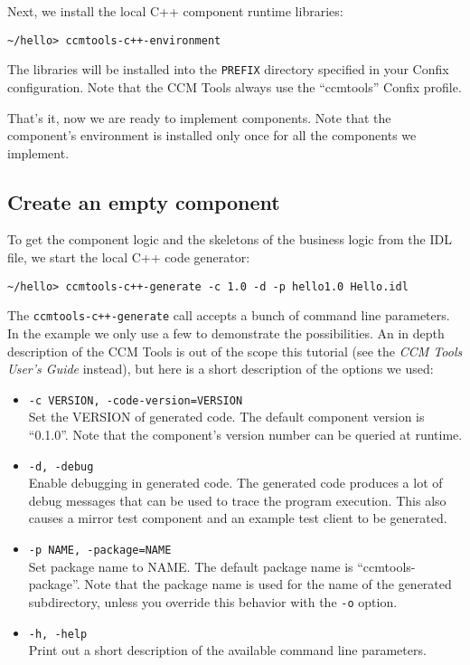 Next, we install the local C++ component runtime libraries:
\begin{small}
\begin{verbatim}
~/hello> ccmtools-c++-environment
\end{verbatim}
\end{small}
The libraries will be installed into the {\tt PREFIX} directory specified in
your Confix configuration. Note that the CCM Tools always use the ``ccmtools''
Confix profile.

That's it, now we are ready to implement components. Note that the component's
environment is installed only once for all the components we implement.

\subsection{Create an empty component}

To get the component logic and the skeletons of the business logic from the IDL
file, we start the local C++ code generator:
\begin{small}
\begin{verbatim}
~/hello> ccmtools-c++-generate -c 1.0 -d -p hello1.0 Hello.idl
\end{verbatim}
\end{small}

The {\tt ccmtools-c++-generate} call accepts a bunch of command line parameters.
In the example we only use a few to demonstrate the possibilities. An in depth
description of the CCM Tools is out of the scope this tutorial (see the {\it CCM
Tools User's Guide} instead), but here is a short description of the options we
used:
\begin{itemize}
\item {\tt -c VERSION, -\-code-version=VERSION }\\
Set the VERSION of generated code. The default component version is ``0.1.0''.
Note that the component's version number can be queried at runtime.

\item {\tt -d, -\-debug }\\
Enable debugging in generated code. The generated code produces a lot of debug
messages that can be used to trace the program execution. This also causes a
mirror test component and an example test client to be generated.

\item {\tt -p NAME, -\-package=NAME}\\
Set package name to NAME. The default package name is ``ccmtools-package''. Note
that the package name is used for the name of the generated subdirectory, unless
you override this behavior with the {\tt -o} option.

\item {\tt -h, -\-help}\\
Print out a short description of the available command line parameters.
\end{itemize}

